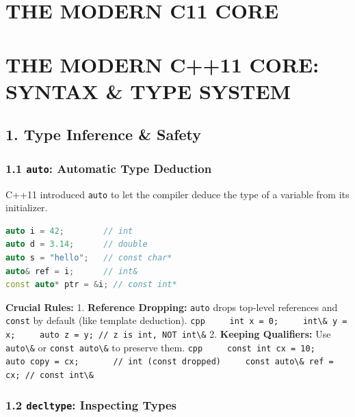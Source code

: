 \hypertarget{the-modern-c11-core}{%
\chapter{THE MODERN C11 CORE}\label{the-modern-c11-core}}

\hypertarget{the-modern-c11-core-syntax-type-system}{%
\chapter{THE MODERN C++11 CORE: SYNTAX \& TYPE
SYSTEM}\label{the-modern-c11-core-syntax-type-system}}

\hypertarget{type-inference-safety}{%
\section{1. Type Inference \& Safety}\label{type-inference-safety}}

\hypertarget{auto-automatic-type-deduction}{%
\subsection{\texorpdfstring{1.1 \texttt{auto}: Automatic Type
Deduction}{1.1 auto: Automatic Type Deduction}}\label{auto-automatic-type-deduction}}

C++11 introduced \passthrough{\lstinline!auto!} to let the compiler
deduce the type of a variable from its initializer.

\begin{lstlisting}[language={C++}]
auto i = 42;        // int
auto d = 3.14;      // double
auto s = "hello";   // const char*
auto& ref = i;      // int&
const auto* ptr = &i; // const int*
\end{lstlisting}

\textbf{Crucial Rules:} 1. \textbf{Reference Dropping:}
\passthrough{\lstinline!auto!} drops top-level references and
\passthrough{\lstinline!const!} by default (like template deduction).
\passthrough{\lstinline!cpp     int x = 0;     int\& y = x;     auto z = y; // z is int, NOT int\&!}
2. \textbf{Keeping Qualifiers:} Use \passthrough{\lstinline!auto\&!} or
\passthrough{\lstinline!const auto\&!} to preserve them.
\passthrough{\lstinline!cpp     const int cx = 10;     auto copy = cx;       // int (const dropped)     const auto\& ref = cx; // const int\&!}

\hypertarget{decltype-inspecting-types}{%
\subsection{\texorpdfstring{1.2 \texttt{decltype}: Inspecting
Types}{1.2 decltype: Inspecting Types}}\label{decltype-inspecting-types}}

